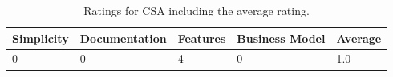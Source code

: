 \begin{table}[tp] 
\centering 
\begin{tabularx}{\linewidth}{|X|X|X|X|X|}
\hline
Simplicity & Documentation & Features & Business Model & Average \\ 
\hline 
0 & 0 & 4 & 0 & 1.0 \\ 
\hline 
\end{tabularx} 
\caption[Ratings for CSA] {
Ratings for CSA including the average rating.
} 
\label{tab:rating-CSA}
\end{table}







